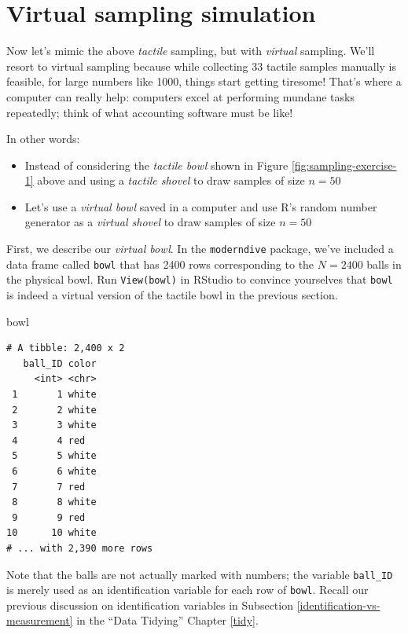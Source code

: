 \documentclass[12pt,]{krantz}
\makeatletter
\newenvironment{Shaded}{\begin{snugshade}}{\end{snugshade}}
\newcommand{\NormalTok}[1]{#1}
\providecommand{\tightlist}{%
  \setlength{\itemsep}{0pt}\setlength{\parskip}{0pt}}
\newenvironment{kframe}{%
\medskip{}
\setlength{\fboxsep}{.8em}
 \def\at@end@of@kframe{}%
 \ifinner\ifhmode%
  \def\at@end@of@kframe{\end{minipage}}%
  \begin{minipage}{\columnwidth}%
 \fi\fi%
 \def\FrameCommand##1{\hskip\@totalleftmargin \hskip-\fboxsep
 \colorbox{shadecolor}{##1}\hskip-\fboxsep
     \hskip-\linewidth \hskip-\@totalleftmargin \hskip\columnwidth}%
 \MakeFramed {\advance\hsize-\width
   \@totalleftmargin\z@ \linewidth\hsize
   \@setminipage}}%
 {\par\unskip\endMakeFramed%
 \at@end@of@kframe}
\renewenvironment{Shaded}{\begin{kframe}}{\end{kframe}}
\makeatother
\begin{document}
\section{Virtual sampling simulation}\label{virtual}

Now let's mimic the above \emph{tactile} sampling, but with
\emph{virtual} sampling. We'll resort to virtual sampling because while
collecting 33 tactile samples manually is feasible, for large numbers
like 1000, things start getting tiresome! That's where a computer can
really help: computers excel at performing mundane tasks repeatedly;
think of what accounting software must be like!

In other words:

\begin{itemize}
\tightlist
\item
  Instead of considering the \emph{tactile bowl} shown in Figure
  \ref{fig:sampling-exercise-1} above and using a \emph{tactile shovel}
  to draw samples of size \(n=50\)
\item
  Let's use a \emph{virtual bowl} saved in a computer and use R's random
  number generator as a \emph{virtual shovel} to draw samples of size
  \(n=50\)
\end{itemize}

First, we describe our \emph{virtual bowl}. In the \texttt{moderndive}
package, we've included a data frame called \texttt{bowl} that has 2400
rows corresponding to the \(N=2400\) balls in the physical bowl. Run
\texttt{View(bowl)} in RStudio to convince yourselves that \texttt{bowl}
is indeed a virtual version of the tactile bowl in the previous section.

\begin{Shaded}
\begin{Highlighting}[]
\NormalTok{bowl}
\end{Highlighting}
\end{Shaded}

\begin{verbatim}
# A tibble: 2,400 x 2
   ball_ID color
     <int> <chr>
 1       1 white
 2       2 white
 3       3 white
 4       4 red  
 5       5 white
 6       6 white
 7       7 red  
 8       8 white
 9       9 red  
10      10 white
# ... with 2,390 more rows
\end{verbatim}

Note that the balls are not actually marked with numbers; the variable
\texttt{ball\_ID} is merely used as an identification variable for each
row of \texttt{bowl}. Recall our previous discussion on identification
variables in Subsection \ref{identification-vs-measurement} in the
``Data Tidying'' Chapter \ref{tidy}.
\end{document}
